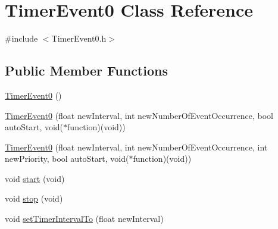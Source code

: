 \hypertarget{class_timer_event0}{
\section{TimerEvent0 Class Reference}
\label{d3/dce/class_timer_event0}
}


{\ttfamily \#include $<$TimerEvent0.h$>$}

\subsection*{Public Member Functions}
\begin{DoxyCompactItemize}
\item 
\hyperlink{class_timer_event0_aee15c9fea5842415a3f69bde3c0b74f9}{TimerEvent0} ()
\item 
\hyperlink{class_timer_event0_a4a5e4715778048f9a1ac550631e6976f}{TimerEvent0} (float newInterval, int newNumberOfEventOccurrence, bool autoStart, void($\ast$function)(void))
\item 
\hyperlink{class_timer_event0_a6607bac4ebfd4451532691693077484f}{TimerEvent0} (float newInterval, int newNumberOfEventOccurrence, int newPriority, bool autoStart, void($\ast$function)(void))
\item 
void \hyperlink{class_timer_event0_aac09a97ae680ef0a13392e436018a0d2}{start} (void)
\item 
void \hyperlink{class_timer_event0_affbfc896cf7971809eb3f24254ecec1d}{stop} (void)
\item 
void \hyperlink{class_timer_event0_a9d873d18738bbf6662b242a942ea01d6}{setTimerIntervalTo} (float newInterval)
\end{DoxyCompactItemize}


